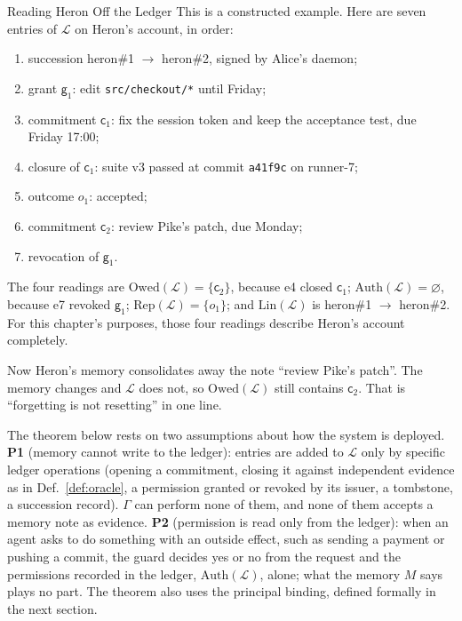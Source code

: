 \begin{pdexample}{Reading Heron Off the Ledger}
\setlength{\parskip}{4pt plus 1pt}
\label{ex:stp-four-readings}
This is a constructed example. Here are seven entries of $\mathcal{L}$ on Heron's
account, in order:
\begin{enumerate}[label=e\arabic*,leftmargin=2.2em,itemsep=1pt]
\item succession heron\#1 $\to$ heron\#2, signed by Alice's daemon;
\item grant $\mathsf{g}_1$: edit \texttt{src/checkout/*} until Friday;
\item commitment $\mathsf{c}_1$: fix the session token and keep the acceptance test, due
Friday 17:00;
\item closure of $\mathsf{c}_1$: suite v3 passed at commit \texttt{a41f9c} on runner-7;
\item outcome $o_1$: accepted;
\item commitment $\mathsf{c}_2$: review Pike's patch, due Monday;
\item revocation of $\mathsf{g}_1$.
\end{enumerate}
The four readings are $\mathrm{Owed}(\mathcal{L})=\{\mathsf{c}_2\}$, because e4 closed $\mathsf{c}_1$;
$\mathrm{Auth}(\mathcal{L})=\varnothing$, because e7 revoked $\mathsf{g}_1$;
$\mathrm{Rep}(\mathcal{L})=\{o_1\}$; and $\mathrm{Lin}(\mathcal{L})$ is heron\#1 $\to$ heron\#2.
For this chapter's purposes, those four readings describe Heron's account
completely.

Now Heron's memory consolidates away the note ``review Pike's patch''. The
memory changes and $\mathcal{L}$ does not, so $\mathrm{Owed}(\mathcal{L})$ still contains $\mathsf{c}_2$.
That is ``forgetting is not resetting'' in one line.
\end{pdexample}

The theorem below rests on two assumptions about how the system is deployed.
\textbf{P1} (memory cannot write to the ledger): entries are added to $\mathcal{L}$ only
by specific ledger operations (opening a commitment, closing it against
independent evidence as in Def.~\ref{def:oracle}, a permission granted or
revoked by its issuer, a tombstone, a succession record). $\Gamma$ can perform
none of them, and none of them accepts a memory note as evidence. \textbf{P2}
(permission is read only from the ledger): when an agent asks to do something
with an outside effect, such as sending a payment or pushing a commit, the
guard decides yes or no from the request and the permissions recorded in the
ledger, $\mathrm{Auth}(\mathcal{L})$, alone; what the memory $M$ says plays no part. The
theorem also uses the principal binding, defined formally in the next
section.

